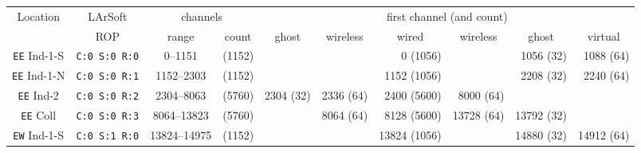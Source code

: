 \begin{table}
  \begin{tabular}{|cc|cc|rrrrrr|}
    \hline
    \hline
    Location            & LArSoft              & \multicolumn{2}{c|}{channels} & \multicolumn{6}{c|}{first channel (and count)}                        \\
                        & ROP                  & \multicolumn{1}{c}{range}
                                                              & count  & \multicolumn{1}{c}{ghost}
                                                                                    & \multicolumn{1}{c}{wireless}
                                                                                                 & \multicolumn{1}{c}{wired}
                                                                                                                & \multicolumn{1}{c}{wireless}
                                                                                                                             & \multicolumn{1}{c}{ghost}
                                                                                                                                          & \multicolumn{1}{c|}{virtual}
                                                                                                                                                       \\
    \hline
    \texttt{EE} Ind-1-S & \texttt{C:0 S:0 R:0} &     0--1151  & (1152) &            &            &     0 (1056) &            &  1056 (32) &  1088 (64) \\
    \texttt{EE} Ind-1-N & \texttt{C:0 S:0 R:1} &  1152--2303  & (1152) &            &            &  1152 (1056) &            &  2208 (32) &  2240 (64) \\
    \texttt{EE} Ind-2   & \texttt{C:0 S:0 R:2} &  2304--8063  & (5760) &  2304 (32) &  2336 (64) &  2400 (5600) &  8000 (64) &            &            \\
    \texttt{EE} Coll    & \texttt{C:0 S:0 R:3} &  8064--13823 & (5760) &            &  8064 (64) &  8128 (5600) & 13728 (64) & 13792 (32) &            \\
    \hline
    \texttt{EW} Ind-1-S & \texttt{C:0 S:1 R:0} & 13824--14975 & (1152) &            &            & 13824 (1056) &            & 14880 (32) & 14912 (64) \\

\end{tabular}
\end{table}
